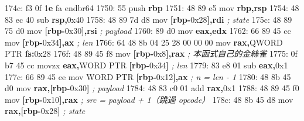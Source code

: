 \documentclass[10pt,a4paper]{article}
\newenvironment{Shaded}{\begin{snugshade}}{\end{snugshade}}
\newcommand{\BaseNTok}[1]{\textcolor[rgb]{0.00,0.00,0.81}{#1}}
\newcommand{\BuiltInTok}[1]{#1}
\newcommand{\CommentTok}[1]{\textcolor[rgb]{0.56,0.35,0.01}{\textit{#1}}}
\newcommand{\DataTypeTok}[1]{\textcolor[rgb]{0.13,0.29,0.53}{#1}}
\newcommand{\DecValTok}[1]{\textcolor[rgb]{0.00,0.00,0.81}{#1}}
\newcommand{\ErrorTok}[1]{\textcolor[rgb]{0.64,0.00,0.00}{\textbf{#1}}}
\newcommand{\FloatTok}[1]{\textcolor[rgb]{0.00,0.00,0.81}{#1}}
\newcommand{\KeywordTok}[1]{\textcolor[rgb]{0.13,0.29,0.53}{\textbf{#1}}}
\newcommand{\NormalTok}[1]{#1}
\newcommand{\OperatorTok}[1]{\textcolor[rgb]{0.81,0.36,0.00}{\textbf{#1}}}
\renewenvironment{Shaded}{%
  \def\FrameCommand{\fboxsep=3.2pt\colorbox{shadecolor}}%
  \MakeFramed{\advance\hsize-\width\FrameRestore\small}%
}{%
  \endMakeFramed
}
\begin{document}
\begin{Shaded}
\begin{Highlighting}[]
\NormalTok{174c: f3 }\FloatTok{0}\BaseNTok{f} \DecValTok{1}\ErrorTok{e}\NormalTok{ fa            endbr64}
\NormalTok{1750: 55                     }\BuiltInTok{push}   \KeywordTok{rbp}
\NormalTok{1751: 48 89 e5               mov    }\KeywordTok{rbp}\OperatorTok{,}\KeywordTok{rsp}
\NormalTok{1754: 48 83 ec }\DecValTok{40}\NormalTok{            sub    }\KeywordTok{rsp}\OperatorTok{,}\BaseNTok{0x40}
\NormalTok{1758: 48 89 7d d8            mov    }\OperatorTok{[}\KeywordTok{rbp}\OperatorTok{{-}}\BaseNTok{0x28}\OperatorTok{],}\KeywordTok{rdi}        \CommentTok{; state}
\NormalTok{175c: 48 89 75 d0            mov    }\OperatorTok{[}\KeywordTok{rbp}\OperatorTok{{-}}\BaseNTok{0x30}\OperatorTok{],}\KeywordTok{rsi}        \CommentTok{; payload}
\NormalTok{1760: 89 d0                  mov    }\KeywordTok{eax}\OperatorTok{,}\KeywordTok{edx}
\NormalTok{1762: 66 89 45 cc            mov    }\OperatorTok{[}\KeywordTok{rbp}\OperatorTok{{-}}\BaseNTok{0x34}\OperatorTok{],}\KeywordTok{ax}         \CommentTok{; len}
\NormalTok{1766: 64 48 8b 04 25 28 00 00 00  }\BuiltInTok{mov} \KeywordTok{rax}\OperatorTok{,}\DataTypeTok{QWORD} \DataTypeTok{PTR} \KeywordTok{fs}\OperatorTok{:}\BaseNTok{0x28}
\NormalTok{176f: 48 89 45 f8            mov    }\OperatorTok{[}\KeywordTok{rbp}\OperatorTok{{-}}\BaseNTok{0x8}\OperatorTok{],}\KeywordTok{rax}         \CommentTok{; 本函式自己的金絲雀}
\NormalTok{1775: 0f b7 }\DecValTok{45}\NormalTok{ cc            movzx  }\KeywordTok{eax}\OperatorTok{,}\DataTypeTok{WORD} \DataTypeTok{PTR} \OperatorTok{[}\KeywordTok{rbp}\OperatorTok{{-}}\BaseNTok{0x34}\OperatorTok{]} \CommentTok{; len}
\NormalTok{1779: 83 e8 }\DecValTok{01}\NormalTok{               sub    }\KeywordTok{eax}\OperatorTok{,}\BaseNTok{0x1}
\NormalTok{177c: 66 89 45 ee            mov    }\DataTypeTok{WORD} \DataTypeTok{PTR} \OperatorTok{[}\KeywordTok{rbp}\OperatorTok{{-}}\BaseNTok{0x12}\OperatorTok{],}\KeywordTok{ax} \CommentTok{; n = len {-} 1}
\NormalTok{1780: 48 8b 45 d0            mov    }\KeywordTok{rax}\OperatorTok{,[}\KeywordTok{rbp}\OperatorTok{{-}}\BaseNTok{0x30}\OperatorTok{]}        \CommentTok{; payload}
\NormalTok{1784: 48 83 c0 }\DecValTok{01}\NormalTok{            add    }\KeywordTok{rax}\OperatorTok{,}\BaseNTok{0x1}
\NormalTok{1788: 48 89 45 f0            mov    }\OperatorTok{[}\KeywordTok{rbp}\OperatorTok{{-}}\BaseNTok{0x10}\OperatorTok{],}\KeywordTok{rax}        \CommentTok{; src = payload + 1（跳過 opcode）}
\NormalTok{178c: 48 8b 45 d8            mov    }\KeywordTok{rax}\OperatorTok{,[}\KeywordTok{rbp}\OperatorTok{{-}}\BaseNTok{0x28}\OperatorTok{]}        \CommentTok{; state}

\end{Highlighting}
\end{Shaded}
\end{document}

